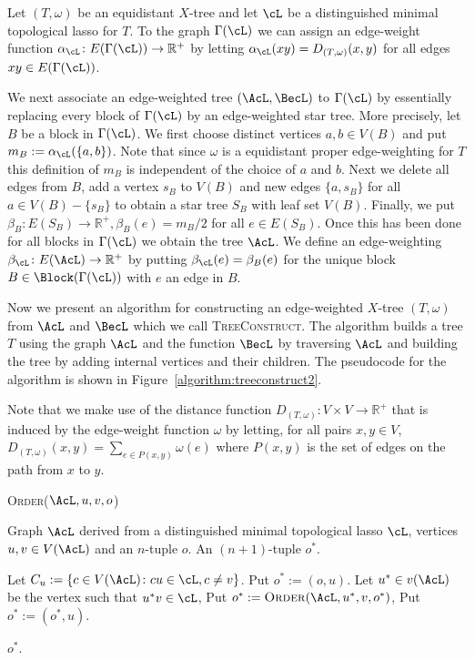 Let $(T,\omega)$ be an equidistant $X$-tree and let $\cL$ be a distinguished
minimal topological lasso for $T$.  To the graph $\Gamma(\cL)$ we can assign
an edge-weight function $\alpha_{\cL} \colon E(\Gamma(\cL)) \to \mathbb{R}^+$
by letting $\alpha_{\cL}(xy) = D_{(T,\omega)}(x,y)$ for all edges $xy \in
E(\Gamma(\cL))$.

We next associate an edge-weighted tree $(\AcL,\BecL)$ to $\Gamma(\cL)$ by
essentially replacing every block of $\Gamma(\cL)$ by an edge-weighted star
tree.  More precisely, let $B$ be a block in $\Gamma(\cL)$.  We first choose
distinct vertices $a,b \in V(B)$ and put $m_B := \alpha_{\cL}(\{a,b\})$.  Note
that since $\omega$ is a equidistant proper edge-weighting for $T$ this
definition of $m_B$ is independent of the choice of $a$ and $b$.  Next we
delete all edges from $B$, add a vertex $s_B$ to $V(B)$ and new edges
$\{a,s_B\}$ for all $a \in V(B) - \{s_B\}$ to obtain a star tree $S_B$ with
leaf set $V(B)$.  Finally, we put $\beta_B \colon E(S_B) \to \mathbb{R}^+,
\beta_B(e) = m_B/2$ for all $e \in E(S_B)$.  Once this has been done for all
blocks in $\Gamma(\cL)$ we obtain the tree $\AcL$.  We define an
edge-weighting $\beta_{\cL} \colon E(\AcL) \to \mathbb{R}^+$ by putting
$\beta_{\cL}(e) = \beta_B(e)$ for the unique block $B \in \Block(\Gamma(\cL))$
with $e$ an edge in $B$.

Now we present an algorithm for constructing an edge-weighted $X$-tree
$(T,\omega)$ from $\AcL$ and $\BecL$ which we call \textsc{TreeConstruct}.
The algorithm builds a tree $T$ using the graph $\AcL$ and the function
$\BecL$ by traversing $\AcL$ and building the tree by adding internal vertices
and their children.  The pseudocode for the algorithm is shown in
Figure~\ref{algorithm:treeconstruct2}.

Note that we make use of the distance function $D_{(T,\omega)} \colon V
\times V \to \mathbb{R}^+$ that is induced by the edge-weight function
$\omega$ by letting, for all pairs $x,y \in V$, $D_{(T,\omega)}(x,y)
= \sum_{e \in P(x,y)} \omega(e)$ where $P(x,y)$ is the set of edges on the
path from $x$ to $y$.

\begin{algorithm}
  \caption{\textsc{Order}($\AcL,u,v,o$)}
  \label{algorithm:order}
  
  \begin{algorithmic}
    \Require Graph $\AcL$ derived from a distinguished minimal topological
    lasso $\cL$, vertices $u,v \in V(\AcL)$ and an $n$-tuple $o$.
    \Ensure An $(n+1)$-tuple $o^*$.

    \State Let $C_u := \{c \in V(\AcL) \colon cu \in \cL, c \neq v\}$.
    \State Put $o^* := (o,u)$.
    \State Let $u^* \in v(\AcL)$ be the vertex such that $u^*v \in \cL$,
    \State Put $o^* := \text{\textsc{Order}}(\AcL, u^*, v, o^*)$,
    \State Put $o^* := (o^*, u)$.
    \EndIf
    \EndFor

    \State \Return $o^*$.
  \end{algorithmic}
\end{algorithm}

